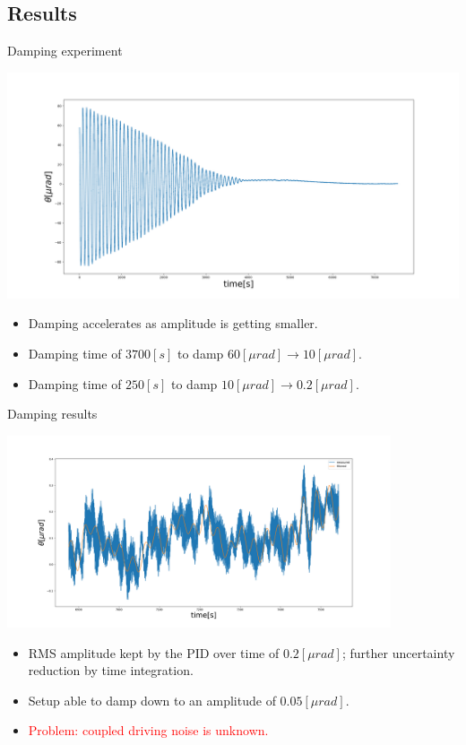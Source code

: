 \documentclass{beamer}
\begin{document}
\subsection{Results}
\begin{frame}{Damping experiment}
	\begin{center}		
		\includegraphics[width=1\textwidth,keepaspectratio]{measured oscillation angle.png}
	\end{center}
	\begin{itemize}	
		
		\item Damping accelerates as amplitude is getting smaller.
		\item Damping time of $3700[s]$ to damp  $ 60 [\mu rad] \rightarrow 10[\mu rad] $.
		\item Damping time of $250[s]$ to damp  $ 10 [\mu rad] \rightarrow 0.2[\mu rad] $.

						
	\end{itemize}
\end{frame}
\begin{frame}{Damping results}
	\begin{center}		
		\includegraphics[width=0.85\textwidth,keepaspectratio]{measured oscillation angle1.png}
	\end{center}
	\begin{itemize}	
		\item RMS amplitude kept by the PID over time of $ 0.2 [\mu rad]$; further uncertainty reduction by time integration.	
		\item Setup able to damp down to an amplitude of $0.05[\mu rad]$.
		\item \textcolor{red}{Problem: coupled driving noise is unknown.}
					
	\end{itemize}
\end{frame}
\end{document}
